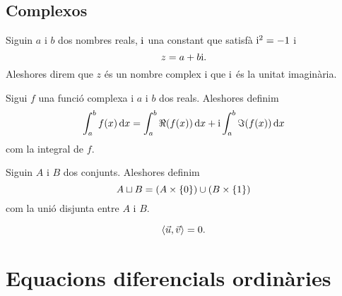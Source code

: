 \documentclass[../../Main.tex]{subfiles}
\begin{document}
	\subsection{Complexos}
	\begin{definition}
		\label{def:nombre complex}
		\label{def:unitat imaginària}
		Siguin \(a\) i \(b\) dos nombres reals, \(\mathrm{i}\) una constant que satisfà \(\mathrm{i}^{2}=-1\) i
		\[z=a+b\mathrm{i}.\]
		Aleshores direm que \(z\) és un nombre complex i que \(\mathrm{i}\) és la unitat imaginària.
	\end{definition}
	\begin{definition}
		\label{def:integral d'una funció complexa}
		Sigui \(f\) una funció complexa i \(a\) i \(b\) dos reals. Aleshores definim
		\[\int_{a}^{b}f(x)\mathop{}\!\mathrm{d} x=\int_{a}^{b}\Re(f(x))\mathop{}\!\mathrm{d} x+\mathrm{i}\int_{a}^{b}\Im(f(x))\mathop{}\!\mathrm{d} x\]
		com la integral de \(f\).
	\end{definition}
	\begin{definition}
		\label{def:unió disjunta}
		Siguin \(A\) i \(B\) dos conjunts. Aleshores definim
		\[A\mathbin{\sqcup} B=(A\times\{0\})\cup(B\times\{1\})\]
		com la unió disjunta entre \(A\) i \(B\).
	\end{definition}
	\begin{definition}
		\label{def:vectors perpendiculars}
		\[\prodesc{\vec{u}}{\vec{v}}=0.\]
	\end{definition}
	\section{Equacions diferencials ordinàries }
\end{document}
